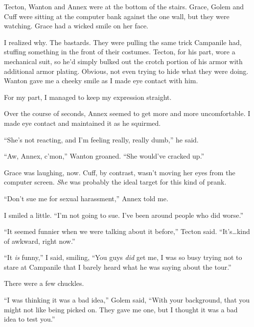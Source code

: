 Tecton, Wanton and Annex were at the bottom of the stairs.  Grace, Golem and Cuff were sitting at the computer bank against the one wall, but they were watching.  Grace had a wicked smile on her face.



I realized why.  The bastards.  They were pulling the same trick Campanile had, stuffing something in the front of their costumes.  Tecton, for his part, wore a mechanical suit, so he'd simply bulked out the crotch portion of his armor with additional armor plating.  Obvious, not even trying to hide what they were doing.  Wanton gave me a cheeky smile as I made eye contact with him.



For my part, I managed to keep my expression straight.



Over the course of seconds, Annex seemed to get more and more uncomfortable.  I made eye contact and maintained it as he squirmed.



``She's not reacting, and I'm feeling really, really dumb,'' he said.



``Aw, Annex, c'mon,'' Wanton groaned.  ``She would've cracked up.''



Grace was laughing, now.  Cuff, by contrast, wasn't moving her eyes from the computer screen.  \emph{She} was probably the ideal target for this kind of prank.



``Don't sue me for sexual harassment,'' Annex told me.



I smiled a little.  ``I'm not going to sue.  I've been around people who did worse.''



``It seemed funnier when we were talking about it before,'' Tecton said.  ``It's\ldots kind of awkward, right now.''



``It \emph{is} funny,'' I said, smiling, ``You guys \emph{did }get me, I was so busy trying not to stare at Campanile that I barely heard what he was saying about the tour.''



There were a few chuckles.



``I was thinking it was a bad idea,'' Golem said, ``With your background, that you might not like being picked on.  They gave me one, but I thought it was a bad idea to test you.''



